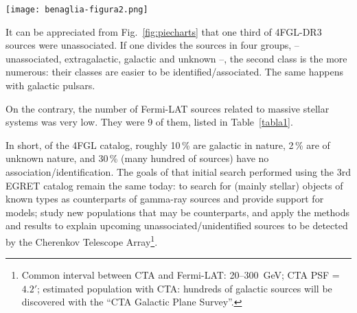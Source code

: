 \documentclass[baaa]{baaa}
\begin{document}
\begin{figure*}[!t]
\centering
\texttt{[image: benaglia-figura2.png]}
\caption{{Distribution} of the sources of the 4FGL--DR3 catalog.  GC = globular cluster; SFR: =  star forming regions; PWN = pulsar wind nebula; SNR = supernova remnants; (X)Bin = binaries or X-ray binaries. Extragal = extragalactic sources. \emph{Left panel:} Percentage of nine groups/classes. \emph{Central panel:} Percentage of four main groups relevant to our work. \emph{Right panel:} Percentages covered by galactic source classes.}
\label{fig:piecharts}
\end{figure*}

It can be appreciated from Fig.~\ref{fig:piecharts} that one third of 4FGL-DR3 sources were unassociated. If one divides the sources in four groups, --unassociated, extragalactic, galactic and unknown --, the second class is the more numerous: their classes are easier to be identified/associated. The same happens with galactic pulsars. 

On the contrary, the number of Fermi-LAT sources related to massive stellar systems was very low. They were 9 of them, listed in Table~\ref{tabla1}. 

In short, of the 4FGL catalog, roughly 10\,\% are galactic in nature, 2\,\% are of unknown nature, and 30\,\% (many hundred of sources) have no association/identification.
The goals of that initial search performed using the 3rd EGRET catalog remain the same today: to search for (mainly stellar) objects of known types as counterparts of gamma-ray sources and provide support for models; study new populations that may be counterparts, and apply the methods and results to explain upcoming unassociated/unidentified sources to be detected by the Cherenkov Telescope Array\footnote{Common interval between CTA and Fermi-LAT: 20--300~GeV; CTA PSF = $4.2'$; estimated population with CTA: hundreds of galactic sources will be discovered with the ``CTA Galactic Plane Survey''.}.
\end{document}
